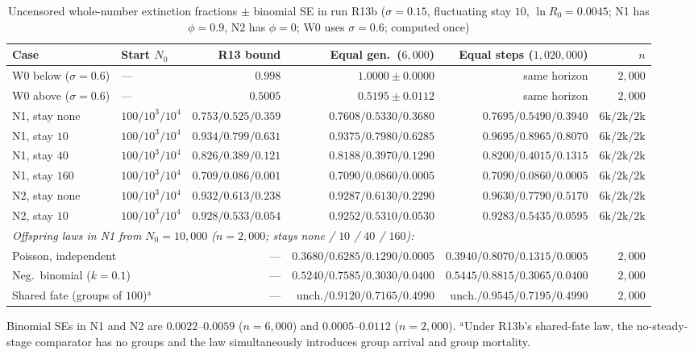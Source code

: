 \begin{table}[htbp]\centering\scriptsize
\setlength{\tabcolsep}{2.5pt}
\caption{Uncensored whole-number extinction fractions $\pm$ binomial SE in run R13b ($\sigma = 0.15$, fluctuating stay $10$, $\ln R_0 = 0.0045$; N1 has $\phi = 0.9$, N2 has $\phi = 0$; W0 uses $\sigma = 0.6$; computed once)}\label{num-esm-tab-r13b}
\begin{tabular}{llrrrr}\toprule
Case & Start $N_0$ & R13 bound & Equal gen.\ ($6{,}000$) & Equal steps ($1{,}020{,}000$) & $n$\\\midrule
W0 below ($\sigma=0.6$) & --- & $0.998$ & $1.0000 \pm 0.0000$ & same horizon & $2{,}000$\\
W0 above ($\sigma=0.6$) & --- & $0.5005$ & $0.5195 \pm 0.0112$ & same horizon & $2{,}000$\\
N1, stay none & $100 / 10^3 / 10^4$ & $0.753 / 0.525 / 0.359$ & $0.7608 / 0.5330 / 0.3680$ & $0.7695 / 0.5490 / 0.3940$ & $6\text{k} / 2\text{k} / 2\text{k}$\\
N1, stay $10$ & $100 / 10^3 / 10^4$ & $0.934 / 0.799 / 0.631$ & $0.9375 / 0.7980 / 0.6285$ & $0.9695 / 0.8965 / 0.8070$ & $6\text{k} / 2\text{k} / 2\text{k}$\\
N1, stay $40$ & $100 / 10^3 / 10^4$ & $0.826 / 0.389 / 0.121$ & $0.8188 / 0.3970 / 0.1290$ & $0.8200 / 0.4015 / 0.1315$ & $6\text{k} / 2\text{k} / 2\text{k}$\\
N1, stay $160$ & $100 / 10^3 / 10^4$ & $0.709 / 0.086 / 0.001$ & $0.7090 / 0.0860 / 0.0005$ & $0.7090 / 0.0860 / 0.0005$ & $6\text{k} / 2\text{k} / 2\text{k}$\\
N2, stay none & $100 / 10^3 / 10^4$ & $0.932 / 0.613 / 0.238$ & $0.9287 / 0.6130 / 0.2290$ & $0.9630 / 0.7790 / 0.5170$ & $6\text{k} / 2\text{k} / 2\text{k}$\\
N2, stay $10$ & $100 / 10^3 / 10^4$ & $0.928 / 0.533 / 0.054$ & $0.9252 / 0.5310 / 0.0530$ & $0.9283 / 0.5435 / 0.0595$ & $6\text{k} / 2\text{k} / 2\text{k}$\\\midrule
\multicolumn{6}{l}{\emph{Offspring laws in N1 from $N_0 = 10{,}000$ ($n = 2{,}000$; stays none / $10$ / $40$ / $160$):}}\\
\multicolumn{2}{l}{Poisson, independent} & --- & $0.3680 / 0.6285 / 0.1290 / 0.0005$ & $0.3940 / 0.8070 / 0.1315 / 0.0005$ & $2{,}000$\\
\multicolumn{2}{l}{Neg.\ binomial ($k = 0.1$)} & --- & $0.5240 / 0.7585 / 0.3030 / 0.0400$ & $0.5445 / 0.8815 / 0.3065 / 0.0400$ & $2{,}000$\\
\multicolumn{2}{l}{Shared fate (groups of $100$)$^{\mathrm{a}}$} & --- & $\text{unch.} / 0.9120 / 0.7165 / 0.4990$ & $\text{unch.} / 0.9545 / 0.7195 / 0.4990$ & $2{,}000$\\\bottomrule
\end{tabular}
\par\smallskip\raggedright\footnotesize
Binomial SEs in N1 and N2 are $0.0022$--$0.0059$ ($n = 6{,}000$) and $0.0005$--$0.0112$ ($n = 2{,}000$). $^{\mathrm{a}}$Under R13b's shared-fate law, the no-steady-stage comparator has no groups and the law simultaneously introduces group arrival and group mortality.
\end{table}


